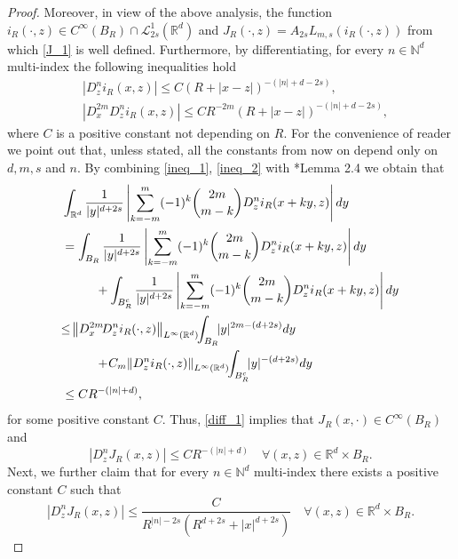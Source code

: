 \documentclass[letterpaper, 11pt,  reqno]{amsart}
\theoremstyle{definition}
\theoremstyle{remark}
\numberwithin{equation}{section}
\newcommand{\N}{{\mathbb N}}
\newcommand{\R}{{\mathbb R}}
\begin{document}
\begin{proof}
		Moreover, in view of the above analysis, the function $i_R(\cdot, z)\in C^{\infty}({B_R})\cap \mathscr{L}^{1}_{2s}(\R^d)$ and $J_R(\cdot,z)=A_{2s} L_{m,s}(i_R(\cdot,z))$ from which \eqref{J_1} is well defined.
Furthermore, by differentiating, for every $n\in \N^{d}$ multi-index the following inequalities hold
\begin{align}
& |D^{n}_z i_R(x,z)|\le C(R+|x-z|)^{-(|n|+d-2s)}, \label{ineq_1}\\
& |D^{2m}_x D^{n}_{z}i_R(x,z)|\le CR^{-2m} (R+|x-z|)^{-(|n|+d-2s)},\label{ineq_2}
\end{align}
where $C$ is a positive constant not depending on $R$. For the convenience of reader we point out that, unless stated, all the constants from now on depend only on $d,m,s$ and $n$.
		By combining \eqref{ineq_1}, \eqref{ineq_2} with  \cite{Abatangelo_2}*{Lemma 2.4} we obtain that 
		\begin{equation}\label{diff_1}
			\begin{split}
				& \int_{\R^d}  \frac{1}{|y|^{d+2s}}  \left|\sum_{k=-m}^{m}(-1)^{k}\binom{2m}{m-k}  D^{n}_z i_R(x+ky,z)\right|dy\\
				&=\int_{B_R}\frac{1}{|y|^{d+2s}}\left|\sum_{k=-m}^{m}(-1)^{k}\binom{2m}{m-k}D^{n}_z i_R(x+ky,z)\right|dy\\
				&\hphantom{XXX} +\int_{B^c_R}\frac{1}{|y|^{d+2s}}\left|\sum_{k=-m}^{m}(-1)^{k}\binom{2m}{m-k}D^{n}_z i_R(x+ky,z)\right|dy\\
				&\!\!\le \!\left\|D^{2m}_x\! D^{n}_{z}i_R(\cdot ,z)\right\|_{L^{\infty}(\R^d)}\!\!\int_{B_R}\!\!|y|^{2m-(d+2s)}dy\!\\
				&\hphantom{XXX}+\!C_m\!\left\|D^{n}_z i_R(\cdot,z)\right\|_{L^{\infty}(\R^d)}\!\!\int_{B^c_R}\!\!|y|^{-(d+2s)}dy\\
				& \le C R^{-(|n|+d)},
			\end{split}
		\end{equation}
		for some positive constant $C$.
		Thus, \eqref{diff_1} implies that $J_R(x, \cdot )\in C^{\infty}({B_R})$ and 
		\begin{equation*}
			|D^{n}_z J_R(x,z)|\le  CR^{-(|n|+d)}\quad \forall (x,z)\in \R^d\times B_R.
		\end{equation*}
		Next, we further claim that for every $n\in \N^{d}$ multi-index there exists a positive constant $C$  such that 
\begin{equation}\label{diff_2}
|D^{n}_z J_R(x,z)|\le  \frac{C
}{R^{|n|-2s}(R^{d+2s}+|x|^{d+2s})}\quad \forall (x,z)\in \R^d\times B_R.
\end{equation}

\end{proof}
\end{document}
